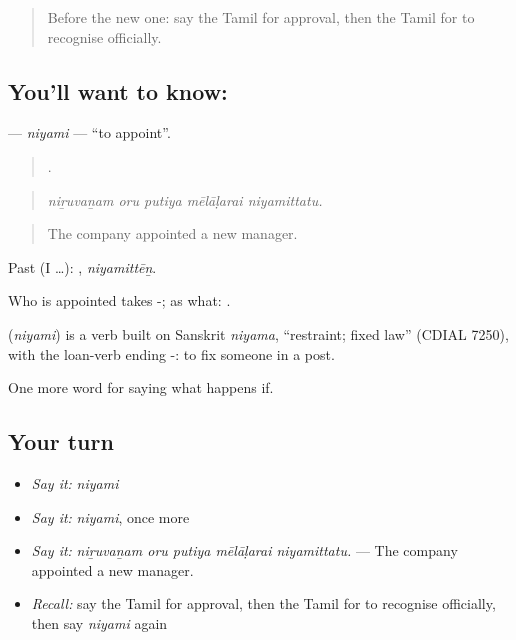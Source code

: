 \label{lesson:TA-C388-niyami}



\begin{quote}
Before the new one: say the Tamil for approval, then the Tamil for to recognise officially.
\end{quote}

\subsection*{You'll want to know: }
\textbf{} — \emph{niyami} — \textquotedblleft{}to appoint\textquotedblright{}.

\begin{quote}
    .
\end{quote}

\begin{quote}
\emph{niṟuvaṉam oru putiya mēlāḷarai niyamittatu.}
\end{quote}

\begin{quote}
The company appointed a new manager.
\end{quote}

Past (I …): , \emph{niyamittēṉ}.

Who is appointed takes -; as what:  .

\begin{cousinweb}
\textbf{} (\emph{niyami}) is a verb built on Sanskrit \emph{niyama}, \textquotedblleft{}restraint; fixed law\textquotedblright{} (CDIAL 7250), with the loan-verb ending -: to fix someone in a post.
\end{cousinweb}

\begin{grammarlens}[title={What you've built}]
One more word for saying what happens if.
\end{grammarlens}

\subsection*{Your turn}
\begin{itemize}
\raggedright
  \item \emph{Say it:} \emph{niyami}
  \item \emph{Say it:} \emph{niyami}, once more
  \item \emph{Say it:} \emph{niṟuvaṉam oru putiya mēlāḷarai niyamittatu.} — The company appointed a new manager.
  \item \emph{Recall:} say the Tamil for approval, then the Tamil for to recognise officially, then say \emph{niyami} again
\end{itemize}


